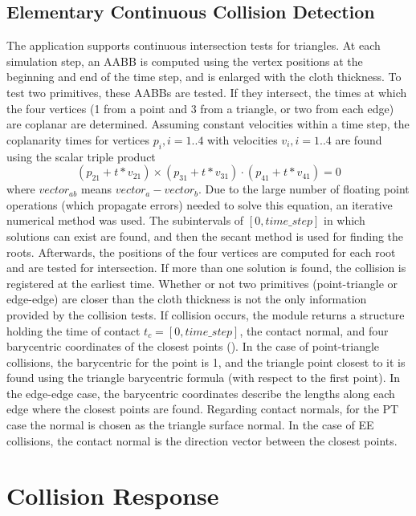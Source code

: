 \subsection{Elementary Continuous Collision Detection}
\label{sub-sec:ccd}

The application supports continuous intersection tests for triangles. At each simulation step, an AABB is computed using the vertex positions at the beginning and end of the time step, and is enlarged with the cloth thickness. To test two primitives, these AABBs are tested. If they intersect, the times at which the four vertices (1 from a point and 3 from a triangle, or two from each edge) are coplanar are determined. Assuming constant velocities within a time step, the coplanarity times for vertices $p_{i}, i = 1..4$ with velocities $v_{i}, i = 1..4$ are found using the scalar triple product \[(p_{21} + t * v_{21}) \times (p_{31} + t * v_{31}) \cdot (p_{41} + t * v_{41}) = 0\] where $vector_{ab}$ means $vector_{a} - vector_{b}$. Due to the large number of floating point operations (which propagate errors) needed to solve this equation, an iterative numerical method was used. The subintervals of $[0, time\_step]$ in which solutions can exist are found, and then the secant method is used for finding the roots. Afterwards, the positions of the four vertices are computed for each root and are tested for intersection. If more than one solution is found, the collision is registered at the earliest time. Whether or not two primitives (point-triangle or edge-edge) are closer than the cloth thickness is not the only information provided by the collision tests. \label{bary}If collision occurs, the module returns a structure holding the time of contact $t_{c} = [0, time\_step]$, the contact normal, and four barycentric coordinates of the closest points (\citep{bridson02}). In the case of point-triangle collisions, the barycentric for the point is 1, and the triangle point closest to it is found using the triangle barycentric formula (with respect to the first point). In the edge-edge case, the barycentric coordinates describe the lengths along each edge where the closest points are found. Regarding contact normals, for the PT case the normal is chosen as the triangle surface normal. In the case of EE collisions, the contact normal is the direction vector between the closest points.

\section{Collision Response}
\label{sec:crimpl}

